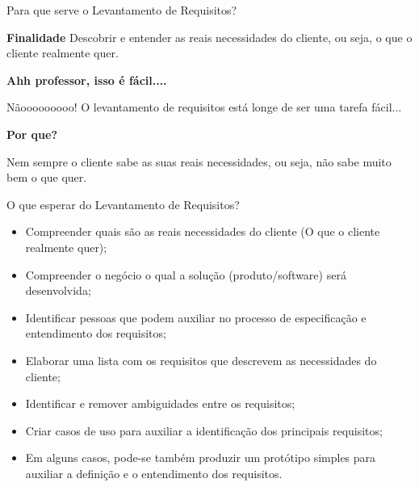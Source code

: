 \documentclass[xcolor=x11names,compress]{beamer}
\begin{document}
\begin{frame}{Para que serve o Levantamento de Requisitos?}

\begin{alertblock}{\textbf{Finalidade}}
Descobrir e entender as reais necessidades do cliente, ou seja, o que o cliente realmente quer.
\end{alertblock}

\pause

\begin{alertblock}{\textbf{Ahh professor, isso é fácil....}}

Nãooooooooo! O levantamento de requisitos está longe de ser uma tarefa fácil...

\end{alertblock}

\pause 

\begin{alertblock}{\textbf{Por que?}}

Nem sempre o cliente sabe as suas reais necessidades, ou seja, não sabe muito bem o que quer.

\end{alertblock}

\end{frame}


\begin{frame}[allowframebreaks=.8]{O que esperar do Levantamento de Requisitos?}

\begin{itemize}
\itemsep 5mm

\item Compreender quais são as reais necessidades do cliente (O que o cliente realmente quer);

\item Compreender o negócio o qual a solução (produto/software) será desenvolvida;

\item Identificar pessoas que podem auxiliar no processo de especificação e entendimento dos requisitos;

\item Elaborar uma lista com os requisitos que descrevem as necessidades do cliente;

\item Identificar e remover ambiguidades entre os requisitos;

\item Criar casos de uso para auxiliar a identificação dos principais requisitos;

\item Em alguns casos, pode-se também produzir um protótipo simples para auxiliar a definição e o entendimento dos requisitos.
\end{itemize}

\end{frame}
\end{document}
